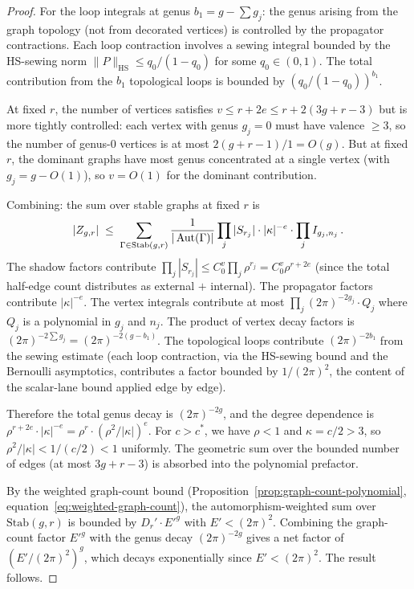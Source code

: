 \begin{proof}
For the loop integrals at genus $b_1 = g - \sum g_j$: the
genus arising from the graph topology (not from decorated
vertices) is controlled by the propagator contractions. Each
loop contraction involves a sewing integral bounded by the
HS-sewing norm $\|P\|_{\mathrm{HS}} \leq q_0 / (1-q_0)$ for
some $q_0 \in (0,1)$. The total contribution from the $b_1$
topological loops is bounded by
$(q_0/(1-q_0))^{b_1}$.

At fixed $r$, the number of vertices satisfies $v \leq r + 2e
\leq r + 2(3g+r-3)$ but is more tightly controlled: each
vertex with genus $g_j = 0$ must have valence $\geq 3$, so the
number of genus-$0$ vertices is at most $2(g + r - 1)/1 =
O(g)$. But at fixed $r$, the dominant graphs have most genus
concentrated at a single vertex (with $g_j = g - O(1)$), so
$v = O(1)$ for the dominant contribution.

Combining: the sum over stable graphs at fixed $r$ is
\[
|Z_{g,r}| \;\leq\;
\sum_{\Gamma \in \mathrm{Stab}(g,r)}
\frac{1}{|\operatorname{Aut}(\Gamma)|}
\prod_j |S_{r_j}|
\cdot |\kappa|^{-e}
\cdot \prod_j I_{g_j, n_j}\,.
\]
The shadow factors contribute $\prod_j |S_{r_j}| \leq
C_0^v \prod_j \rho^{r_j} = C_0^v \rho^{r+2e}$ (since the
total half-edge count distributes as external $+$ internal).
The propagator factors contribute $|\kappa|^{-e}$. The vertex
integrals contribute at most $\prod_j (2\pi)^{-2g_j} \cdot
Q_j$ where $Q_j$ is a polynomial in $g_j$ and $n_j$. The
product of vertex decay factors is
$(2\pi)^{-2\sum g_j} = (2\pi)^{-2(g - b_1)}$. The topological
loops contribute $(2\pi)^{-2b_1}$ from the sewing estimate
(each loop contraction, via the HS-sewing bound and the
Bernoulli asymptotics, contributes a factor bounded by
$1/(2\pi)^2$, the content of the scalar-lane bound
applied edge by edge).

Therefore the total genus decay is $(2\pi)^{-2g}$, and the
degree dependence is $\rho^{r+2e} \cdot |\kappa|^{-e} = \rho^r
\cdot (\rho^2/|\kappa|)^e$. For $c > c^*$, we have
$\rho < 1$ and $\kappa = c/2 > 3$, so
$\rho^2/|\kappa| < 1/(c/2) < 1$ uniformly. The geometric
sum over the bounded number of edges (at most $3g + r - 3$)
is absorbed into the polynomial prefactor.

By the weighted graph-count bound
(Proposition~\ref{prop:graph-count-polynomial},
equation~\eqref{eq:weighted-graph-count}), the
automorphism-weighted sum over $\mathrm{Stab}(g,r)$ is bounded
by $D_r' \cdot E'^g$ with $E' < (2\pi)^2$. Combining the
graph-count factor $E'^g$ with the genus decay $(2\pi)^{-2g}$
gives a net factor of $(E'/(2\pi)^2)^g$, which decays
exponentially since $E' < (2\pi)^2$.
The result follows.
\end{proof}


